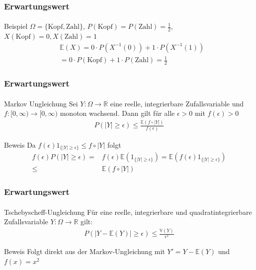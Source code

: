 \documentclass{beamer}
\begin{document}
\begin{frame}
    \frametitle{Erwartungswert}
\framesubtitle{}
\begin{block}{Beispiel}
$\Omega = \{ \text{Kopf},\text{Zahl}\}$, $P(\text{Kopf}) = P(\text{Zahl}) = \frac{1}{2}$, $X(\text{Kopf}) = 0,  X(\text{Zahl}) = 1$ 
\begin{align*}
& \mathbb{E}(X)  = 0 \cdot P(X^{-1}(0) ) + 1 \cdot P(X^{-1}(1)) \\
& =0  \cdot P(\text{Kopf}) + 1 \cdot P(\text{Zahl}) = \frac{1}{2}  
\end{align*}
\end{block}
 \end{frame}



\begin{frame}
    \frametitle{Erwartungswert}
\framesubtitle{}
\begin{block}{Markov Ungleichung}
Sei $Y : \Omega \to \mathbb{R}$  eine  reelle, integrierbare  Zufallsvariable und $f : [0, \infty) \to [0, \infty)$ monoton wachsend.
Dann gilt für alle $\epsilon > 0$ mit $f(\epsilon) > 0$
\begin{align*}
P (|Y |  \geq \epsilon) \leq \frac{\mathbb{E} (f \circ |Y|)}{f(\epsilon)}
\end{align*}
\end{block}
\begin{block}{Beweis}
Da $f(\epsilon) 1_{\{ |Y| \geq  \epsilon \} } \leq f \circ |Y|$ folgt
\begin{align*}
f(\epsilon) P(|Y| \geq \epsilon) = & f(\epsilon) \mathbb{E}(1_{\{ |Y| \geq  \epsilon \} }) = \mathbb{E}( f(\epsilon) 1_{\{ |Y| \geq  \epsilon \} }) \\
\leq & \mathbb{E}( f \circ |Y|)
\end{align*}
\end{block}
 \end{frame}






\begin{frame}
    \frametitle{Erwartungswert}
\framesubtitle{}
\begin{block}{Tschebyscheff-Ungleichung}
Für eine reelle, integrierbare und quadratintegrierbare  Zufallsvariable $Y : \Omega \to \mathbb{R}$  gilt:
\begin{align*}
P (|Y  - \mathbb{E} (Y)|  \geq \epsilon) \leq \frac{\mathbb{V} (Y)}{ \epsilon^2} 
\end{align*}
\end{block}
\begin{block}{Beweis}
Folgt direkt aus der Markov-Ungleichung mit $Y' = Y -\mathbb{E}(Y)$ und $f(x) = x^2$
\end{block}
 \end{frame}
\end{document}
